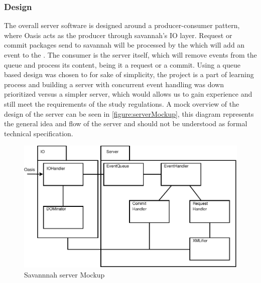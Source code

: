 \subsubsection*{Design}
The overall server software is designed around a producer-consumer pattern, where Oasis acts as the producer through savannah's IO layer.
Request or commit packages send to savannah will be processed by the  which will add an event to the . The consumer is the server itself, which will remove events from the queue and process its content, being it a request or a commit. Using a queue based design was chosen to for sake of simplicity, the project is a part of learning process and building a server with concurrent event handling was down prioritized versus a simpler server, which would allows us to gain experience and still meet the requirements of the study regulations.
 A mock overview of the design of the server can be seen in \autoref{figure:serverMockup}, this diagram represents the general idea and flow of the server and should not be understood as formal technical specification.
\begin{figure}[H]
 \centering
  \includegraphics[scale=1]{images/savaIniDesign}
 \caption{Savannnah server Mockup}
 \label{figure:serverMockup}
\end{figure}
